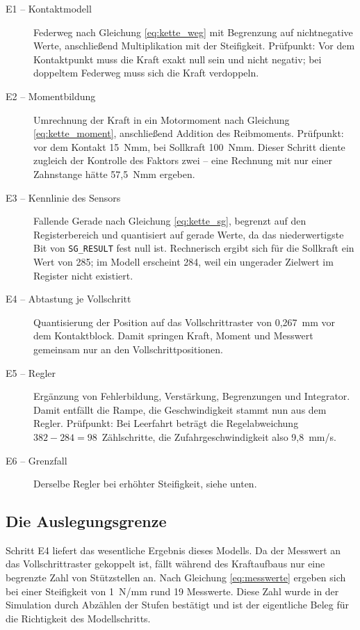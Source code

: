 \begin{description}
    \item[E1 -- Kontaktmodell] Federweg nach Gleichung \ref{eq:kette_weg} mit Begrenzung
          auf nichtnegative Werte, anschließend Multiplikation mit der Steifigkeit.
          Prüfpunkt: Vor dem Kontaktpunkt muss die Kraft exakt null sein und nicht
          negativ; bei doppeltem Federweg muss sich die Kraft verdoppeln.
    \item[E2 -- Momentbildung] Umrechnung der Kraft in ein Motormoment nach Gleichung
          \ref{eq:kette_moment}, anschließend Addition des Reibmoments. Prüfpunkt: vor
          dem Kontakt 15~Nmm, bei Sollkraft 100~Nmm. Dieser Schritt diente zugleich der
          Kontrolle des Faktors zwei -- eine Rechnung mit nur einer Zahnstange hätte
          57,5~Nmm ergeben.
    \item[E3 -- Kennlinie des Sensors] Fallende Gerade nach Gleichung \ref{eq:kette_sg},
          begrenzt auf den Registerbereich und quantisiert auf gerade Werte, da das
          niederwertigste Bit von \texttt{SG\_RESULT} fest null ist. Rechnerisch ergibt
          sich für die Sollkraft ein Wert von 285; im Modell erscheint 284, weil ein
          ungerader Zielwert im Register nicht existiert.
    \item[E4 -- Abtastung je Vollschritt] Quantisierung der Position auf das
          Vollschrittraster von 0,267~mm vor dem Kontaktblock. Damit springen Kraft,
          Moment und Messwert gemeinsam nur an den Vollschrittpositionen.
    \item[E5 -- Regler] Ergänzung von Fehlerbildung, Verstärkung, Begrenzungen und
          Integrator. Damit entfällt die Rampe, die Geschwindigkeit stammt nun aus dem
          Regler. Prüfpunkt: Bei Leerfahrt beträgt die Regelabweichung
          $382 - 284 = 98$~Zählschritte, die Zufahrgeschwindigkeit also 9,8~mm/s.
    \item[E6 -- Grenzfall] Derselbe Regler bei erhöhter Steifigkeit, siehe unten.
\end{description}

\subsection*{Die Auslegungsgrenze}

Schritt E4 liefert das wesentliche Ergebnis dieses Modells. Da der Messwert an das
Vollschrittraster gekoppelt ist, fällt während des Kraftaufbaus nur eine begrenzte Zahl
von Stützstellen an. Nach Gleichung \ref{eq:messwerte} ergeben sich bei einer Steifigkeit
von 1~N/mm rund 19 Messwerte. Diese Zahl wurde in der Simulation durch Abzählen der
Stufen bestätigt und ist der eigentliche Beleg für die Richtigkeit des Modellschritts.

